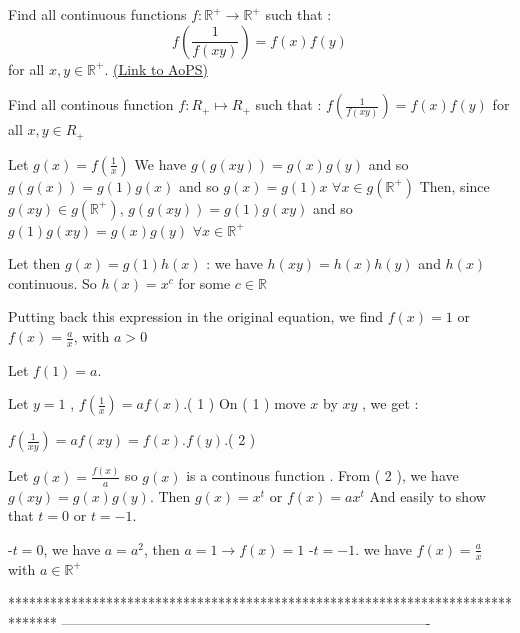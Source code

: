 \begin{problem}
	Find all continuous functions $f: \mathbb R^{+} \to \mathbb R^{+}$ such that :
\[f\left(\frac{1}{f(xy)}\right)=f(x)f(y)\] 
for all $ x,y\in \mathbb R^+$.
	\flushright \href{https://artofproblemsolving.com/community/c6h164574}{(Link to AoPS)}
\end{problem}



\begin{mysolution}
	\begin{tcolorbox}Find all continous function  $ f: R_{+}\mapsto R_{+}$ such that :
                             $ f(\frac{1}{f(xy)}) = f(x)f(y)$ for all $ x,y\in R_{+}$\end{tcolorbox}

Let $ g(x)=f(\frac{1}{x})$
We have $ g(g(xy))=g(x)g(y)$ and so $ g(g(x))=g(1)g(x)$ and so $ g(x)=g(1)x$ $ \forall x\in g(\mathbb{R}^{+})$
Then, since $ g(xy)\in g(\mathbb{R}^{+})$, $ g(g(xy))=g(1)g(xy)$ and so $ g(1)g(xy)=g(x)g(y)$ $ \forall x\in\mathbb{R}^{+}$

Let then $ g(x)=g(1)h(x)$ : we have $ h(xy)=h(x)h(y)$ and $ h(x)$ continuous. So $ h(x)=x^{c}$ for some $ c\in\mathbb{R}$

Putting back this expression in the original equation, we find $ f(x)=1$ or $ f(x)=\frac{a}{x}$, with $ a>0$
\end{mysolution}



\begin{mysolution}
	Let $ f(1) = a$.

Let $ y = 1$ , $ f(\frac{1}{x}) = af(x)$.( 1 )
On ( 1 ) move $ x$ by $ xy$ , we get :

$ f(\frac{1}{xy}) = af(xy) = f(x).f(y)$.( 2 )

Let $ g(x) =\frac{f(x)}{a}$ so $ g(x)$ is a continous function .
From ( 2 ), we have $ g(xy) = g(x)g(y)$.
Then $ g(x) = x^{t}$ or $ f(x) = ax^{t}$
And easily to show that $ t = 0$ or $ t =-1$.

-$ t = 0$, we have $ a = a^{2}$, then $ a = 1\rightarrow f(x) = 1$
-$ t =-1$. we have $ f(x) =\frac{a}{x}$ with $ a\in\mathbb{R^{+}}$
\end{mysolution}
*******************************************************************************
-------------------------------------------------------------------------------

